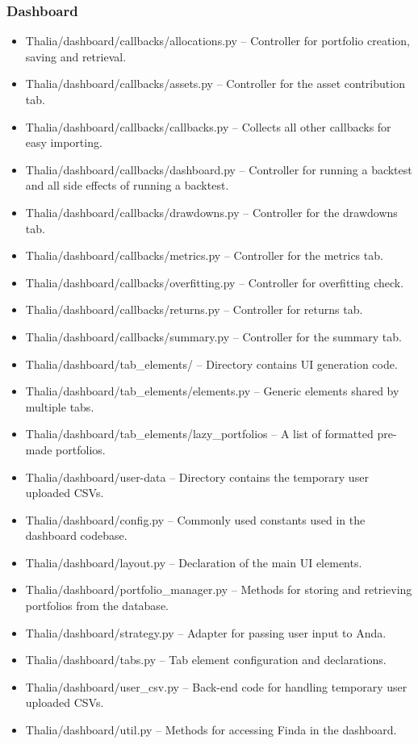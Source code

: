\documentclass[main.tex]{subfiles}
\begin{document}
\subsubsection{Dashboard}\label{dashboard-specific}

\begin{itemize}

\item
  Thalia/dashboard/callbacks/allocations.py -- Controller for portfolio creation, saving and retrieval.
\item
  Thalia/dashboard/callbacks/assets.py -- Controller for the asset contribution tab.
\item
  Thalia/dashboard/callbacks/callbacks.py -- Collects all other
  callbacks for easy importing.
\item
  Thalia/dashboard/callbacks/dashboard.py -- Controller for running a backtest and all side effects of running a backtest.
\item
  Thalia/dashboard/callbacks/drawdowns.py -- Controller for the
  drawdowns tab.
\item
  Thalia/dashboard/callbacks/metrics.py -- Controller for the metrics tab.
\item
  Thalia/dashboard/callbacks/overfitting.py -- Controller for
  overfitting check.
\item
  Thalia/dashboard/callbacks/returns.py -- Controller for returns tab.
\item
  Thalia/dashboard/callbacks/summary.py -- Controller for the summary tab.
\item
  Thalia/dashboard/tab\_elements/ -- Directory contains UI generation code.
\item
  Thalia/dashboard/tab\_elements/elements.py -- Generic elements shared by multiple tabs.
\item
  Thalia/dashboard/tab\_elements/lazy\_portfolios -- A list of formatted pre-made portfolios.
\item
  Thalia/dashboard/user-data -- Directory contains the temporary user uploaded CSVs.
\item
  Thalia/dashboard/config.py -- Commonly used constants used in the dashboard codebase.
\item
  Thalia/dashboard/layout.py -- Declaration of the main UI elements.
\item
  Thalia/dashboard/portfolio\_manager.py -- Methods for storing and retrieving portfolios from the database.
\item
  Thalia/dashboard/strategy.py -- Adapter for passing user input to Anda.
\item
  Thalia/dashboard/tabs.py -- Tab element configuration and declarations.
\item
  Thalia/dashboard/user\_csv.py -- Back-end code for handling temporary user uploaded CSVs.
\item
  Thalia/dashboard/util.py -- Methods for accessing Finda in the
  dashboard.
\end{itemize}
\end{document}
